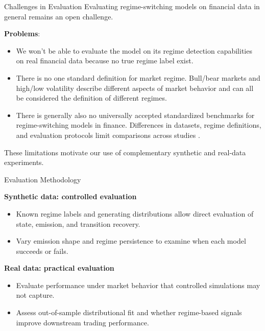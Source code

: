 \begin{frame}{Challenges in Evaluation}
Evaluating regime-switching models on financial data in general remains an open challenge.

\textbf{Problems}:
    \begin{itemize}
        \item We won't be able to evaluate the model on its regime detection capabilities on real financial data because no true regime label exist.
        \item There is no one standard definition for market regime. Bull/bear markets and high/low volatility describe different aspects of market behavior and can all be considered the definition of different regimes.
        \item There is generally also no universally accepted standardized benchmarks for regime-switching models in finance. Differences in
    datasets, regime definitions, and evaluation protocols
    limit comparisons across studies \cite{davi2026}.
    \end{itemize}
These limitations motivate our use of complementary synthetic and real-data experiments.
\end{frame}

\begin{frame}{Evaluation Methodology}

\textbf{Synthetic data: controlled evaluation}
\begin{itemize}
    \item Known regime labels and generating distributions
    allow direct evaluation of state, emission, and
    transition recovery.

    \item Vary emission shape and regime persistence to
    examine when each model succeeds or fails.
\end{itemize}

\medskip

\textbf{Real data: practical evaluation}
\begin{itemize}
    \item Evaluate performance under market behavior that
    controlled simulations may not capture.

    \item Assess out-of-sample distributional fit and whether
    regime-based signals improve downstream trading
    performance.
\end{itemize}

\end{frame}

